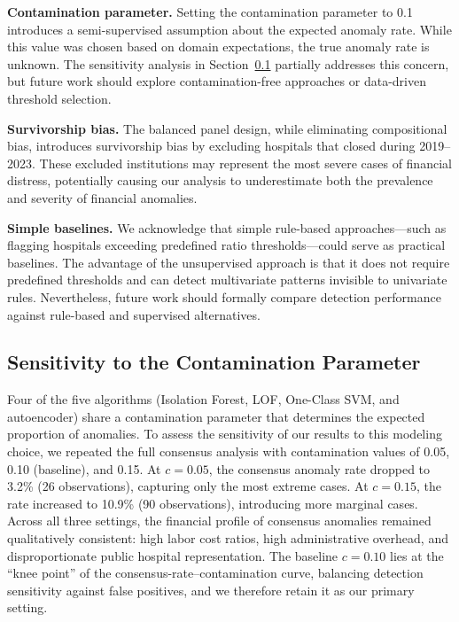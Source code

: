\documentclass{ieeeaccess}
\begin{document}
\textbf{Contamination parameter.} Setting the contamination parameter to 0.1 introduces a semi-supervised assumption about the expected anomaly rate. While this value was chosen based on domain expectations, the true anomaly rate is unknown. The sensitivity analysis in Section~\ref{subsec:sensitivity} partially addresses this concern, but future work should explore contamination-free approaches or data-driven threshold selection.

\textbf{Survivorship bias.} The balanced panel design, while eliminating compositional bias, introduces survivorship bias by excluding hospitals that closed during 2019--2023. These excluded institutions may represent the most severe cases of financial distress, potentially causing our analysis to underestimate both the prevalence and severity of financial anomalies.

\textbf{Simple baselines.} We acknowledge that simple rule-based approaches---such as flagging hospitals exceeding predefined ratio thresholds---could serve as practical baselines. The advantage of the unsupervised approach is that it does not require predefined thresholds and can detect multivariate patterns invisible to univariate rules. Nevertheless, future work should formally compare detection performance against rule-based and supervised alternatives.

\subsection{Sensitivity to the Contamination Parameter}
\label{subsec:sensitivity}

Four of the five algorithms (Isolation Forest, LOF, One-Class SVM, and autoencoder) share a contamination parameter that determines the expected proportion of anomalies. To assess the sensitivity of our results to this modeling choice, we repeated the full consensus analysis with contamination values of 0.05, 0.10 (baseline), and 0.15. At $c = 0.05$, the consensus anomaly rate dropped to 3.2\% (26 observations), capturing only the most extreme cases. At $c = 0.15$, the rate increased to 10.9\% (90 observations), introducing more marginal cases. Across all three settings, the financial profile of consensus anomalies remained qualitatively consistent: high labor cost ratios, high administrative overhead, and disproportionate public hospital representation. The baseline $c = 0.10$ lies at the ``knee point'' of the consensus-rate--contamination curve, balancing detection sensitivity against false positives, and we therefore retain it as our primary setting.
\end{document}
